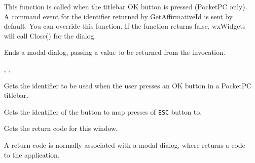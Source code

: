 
This function is called when the titlebar OK button is pressed (PocketPC only).
A command event for the identifier returned by GetAffirmativeId is sent by
default. You can override this function. If the function returns false, wxWidgets
will call Close() for the dialog.


\label{wxdialogendmodal}


Ends a modal dialog, passing a value to be returned from the \rtfsp
invocation.




,\rtfsp
{},\rtfsp
{}


\label{wxdialoggetaffirmativeid}


Gets the identifier to be used when the user presses an OK button in a PocketPC titlebar.




\label{wxdialoggetescapeid}


Gets the identifier of the button to map presses of \texttt{\textsc{ESC}}
button to.




\label{wxdialoggetreturncode}


Gets the return code for this window.


A return code is normally associated with a modal dialog, where  returns
a code to the application.

